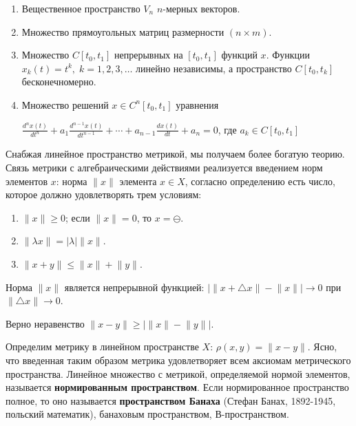 \documentclass[12pt,a4paper,titlepage]{book}
\theoremstyle{definition}
\theoremstyle{plain}
\theoremstyle{remark}
\theoremstyle{remark}
\theoremstyle{remark}
\theoremstyle{plain}
\begin{document}
\begin{enumerate}

	\item Вещественное пространство $V_n$ $n$-мерных векторов.

	\item Множество прямоугольных матриц размерности $(n\times m)$.

	\item Множество $C[t_0,t_1]$ непрерывных на $[t_0,t_1]$ функций $x$. Функции $x_k(t)=t^k,\; k=1,2,3,\dotsc$ линейно независимы, а пространство $C[t_0,t_k]$ бесконечномерно.

	\item Множество решений $x\in C^n[t_0,t_1]$ уравнения

	\begin{center}
	$\frac{d^nx(t)}{dt^n}+a_1\frac{d^{n-1}x(t)}{dt^{n-1}}+\dotsb+a_{n-1}\frac{dx(t)}{dt}+a_n=0$, где $a_k\in C[t_0,t_1]$
	\end{center}

\end{enumerate}


Снабжая линейное пространство метрикой, мы получаем более богатую теорию. Связь метрики с алгебраическими действиями реализуется введением норм элементов $x$: норма $\lVert x\rVert$ элемента $x\in X$, согласно определению есть число, которое должно удовлетворять трем условиям:

\begin{enumerate}

	\item $\lVert x\rVert \geq 0$; если $\lVert x\rVert = 0$, то $x=\ominus$.

	\item $\lVert \lambda x \rVert = \lvert \lambda \rvert \lVert x \rVert$.

	\item $\lVert x+y \rVert\leq\lVert x \rVert + \lVert y \rVert$.

\end{enumerate}


Норма $\lVert x\rVert$ является непрерывной функцией: $\lvert\lVert x+\triangle x\rVert-\lVert x\rVert\rvert\to0$ при $\lVert\triangle x\rVert\to0$.


Верно неравенство $\lVert x-y\rVert\geq\lvert\lVert x\rVert-\lVert y\rVert\rvert$.


Определим метрику в линейном пространстве $X$: $\rho(x,y)=\lVert x-y\rVert$. Ясно, что введенная таким образом метрика удовлетворяет всем аксиомам метрического пространства. Линейное множество с метрикой, определяемой нормой элементов, называется \textbf{нормированным пространством}. Если нормированное пространство полное, то оно называется \textbf{пространством Банаха} (Стефан Банах, 1892-1945, польский математик), банаховым пространством, В-пространством.
\end{document}

